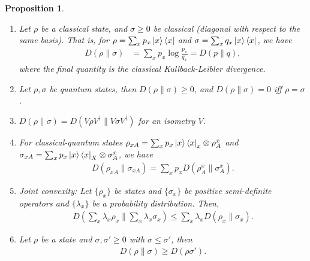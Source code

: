 \documentclass[notoc]{tufte-book}
\newtheorem{proposition}[theorem]{Proposition}
\begin{document}
\begin{tcolorbox}[colframe=white,breakable, colback=black!5, arc=0pt, outer arc=0pt]
\begin{proposition}\label{prop:properties-of-rel-entropy}
\begin{enumerate}
    \item Let $\rho$ be a classical state, and $\sigma \geq 0$ be classical (diagonal with respect to the same basis). That is, for $\rho = \sum_x p_x \ket{x}\bra{x}$ and $\sigma = \sum_x q_x \ket{x}\bra{x}$, we have
    \begin{align}
        D(\rho \| \sigma) &= \sum_x p_x \log{\frac{p_x}{q_x}} = D(p\|q),
    \end{align}
    where the final quantity is the classical Kullback-Leibler divergence. 
    
    \item Let $\rho,\sigma$ be quantum states, then $D(\rho \| \sigma) \geq 0$, and $D(\rho \| \sigma)=0$ iff $\rho=\sigma$.
    \item $D(\rho \| \sigma) = D(V\rho V^{\dagger} \| V\sigma V^{\dagger})$ for an isometry $V$. 
    
    \item For classical-quantum states $\rho_{xA} = \sum_x p_x \ket{x}\bra{x}_x \otimes \rho^x_A$ and $\sigma_{xA} =\sum_x p_x \ket{x}\bra{x}_X \otimes \sigma^x_A$, we have 
    \begin{align}
        D(\rho_{xA} \| \sigma_{xA}) = \sum_x p_x D(\rho_A^x \| \sigma_A^x).
    \end{align}
    \item Joint convexity: Let $\{\rho_x\}$ be states and $\{\sigma_x\}$ be positive semi-definite operators and $\{\lambda_x \}$ be a probability distribution. Then,
    \begin{align}
        D(\sum_x \lambda_x \rho_x \| \sum_x \lambda_x \sigma_x) \leq \sum_x \lambda_x D(\rho_x \| \sigma_x).
    \end{align}
    
    \item Let $\rho$ be a state and $\sigma,\sigma' \geq 0$ with $\sigma \leq \sigma'$, then \begin{align}D(\rho \| \sigma) \geq D(\rho \sigma').\end{align}
\end{enumerate}
\end{proposition}
\end{tcolorbox}
\end{document}
